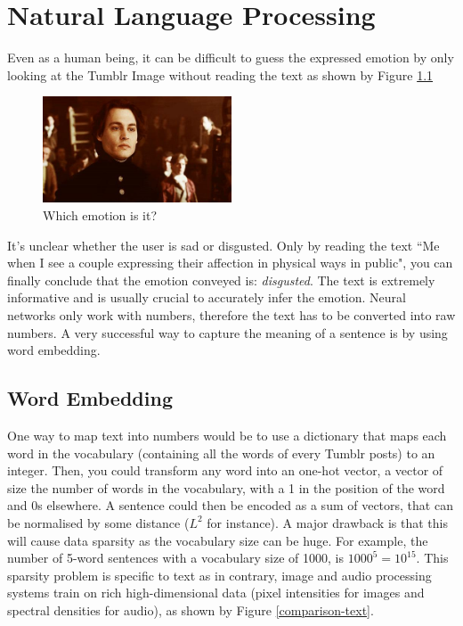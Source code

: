 \chapter{Natural Language Processing}
Even as a human being, it can be difficult to guess the expressed emotion by only looking at the Tumblr Image without reading the text as shown by Figure \ref{disgusted-unclear}

\begin{figure}[H]
    \centering
    \includegraphics[width=0.5\textwidth]{Images/disgusted.jpg}
    \caption{Which emotion is it?}
    \label{disgusted-unclear}
\end{figure}

It's unclear whether the user is sad or disgusted. Only by reading the text ``Me when I see a couple expressing their affection in physical ways in public", you can finally conclude that the emotion conveyed is: {\em disgusted}. The text is extremely informative and is usually crucial to accurately infer the emotion. Neural networks only work with numbers, therefore the text has to be converted into raw numbers. A very successful way to capture the meaning of a sentence is by using word embedding.
\newpage
\section{Word Embedding}
One way to map text into numbers would be to use a dictionary that maps each word in the vocabulary (containing all the words of every Tumblr posts) to an integer. Then, you could transform any word into an one-hot vector, a vector of size the number of words in the vocabulary, with a 1 in the position of the word and 0s elsewhere. A sentence could then be encoded as a sum of vectors, that can be normalised by some distance ($L^2$ for instance). A major drawback is that this will cause data sparsity as the vocabulary size can be huge. For example, the number of 5-word sentences with a vocabulary size of 1000, is $1000^5=10^{15}$. This sparsity problem is specific to text as in contrary, image and audio processing systems train on rich high-dimensional data (pixel intensities for images and spectral densities for audio), as shown by Figure \ref{comparison-text}.

